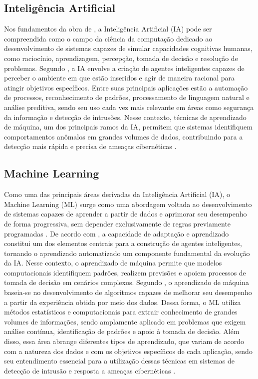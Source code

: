 \documentclass[
    12pt,                %
    openright,           %
    oneside,             %
    a4paper,             %
    english,             %
    brazil               %
]{abntex2}
\begin{document}
\FloatBarrier

\subsection{Inteligência Artificial}
Nos fundamentos da obra de , a Inteligência Artificial (IA) pode ser compreendida como o campo da ciência da computação dedicado ao desenvolvimento de sistemas capazes de simular capacidades cognitivas humanas, como raciocínio, aprendizagem, percepção, tomada de decisão e resolução de problemas. Segundo , a IA envolve a criação de agentes inteligentes capazes de perceber o ambiente em que estão inseridos e agir de maneira racional para atingir objetivos específicos. Entre suas principais aplicações estão a automação de processos, reconhecimento de padrões, processamento de linguagem natural e análise preditiva, sendo seu uso cada vez mais relevante em áreas como segurança da informação e detecção de intrusões. Nesse contexto, técnicas de aprendizado de máquina, um dos principais ramos da IA, permitem que sistemas identifiquem comportamentos anômalos em grandes volumes de dados, contribuindo para a detecção mais rápida e precisa de ameaças cibernéticas \cite{Russell2010}. 

\subsection{Machine Learning}
Como uma das principais áreas derivadas da Inteligência Artificial (IA), o Machine Learning (ML) surge como uma abordagem voltada ao desenvolvimento de sistemas capazes de aprender a partir de dados e aprimorar seu desempenho de forma progressiva, sem depender exclusivamente de regras previamente programadas \cite{Russell2010,Mitchell1997}.
De acordo com , a capacidade de adaptação e aprendizado constitui um dos elementos centrais para a construção de agentes inteligentes, tornando o aprendizado automatizado um componente fundamental da evolução da IA. Nesse contexto, o aprendizado de máquina permite que modelos computacionais identifiquem padrões, realizem previsões e apoiem processos de tomada de decisão em cenários complexos.
Segundo , o aprendizado de máquina baseia-se no desenvolvimento de algoritmos capazes de melhorar seu desempenho a partir da experiência obtida por meio dos dados. Dessa forma, o ML utiliza métodos estatísticos e computacionais para extrair conhecimento de grandes volumes de informações, sendo amplamente aplicado em problemas que exigem análise contínua, identificação de padrões e apoio à tomada de decisão.
Além disso, essa área abrange diferentes tipos de aprendizado, que variam de acordo com a natureza dos dados e com os objetivos específicos de cada aplicação, sendo seu entendimento essencial para a utilização dessas técnicas em sistemas de detecção de intrusão e resposta a ameaças cibernéticas \cite{Mitchell1997,Russell2010}. 
\end{document}
